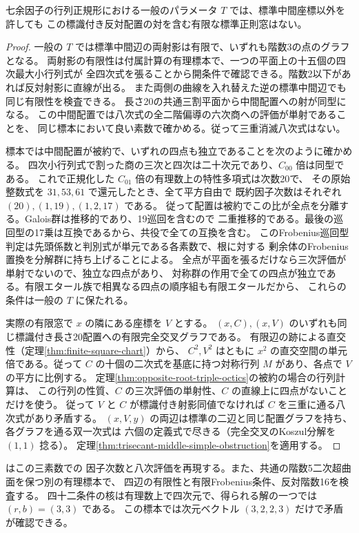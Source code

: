 \begin{corollary}\label{cor:generic-seven-cofactor-pair-excluded}
七余因子の行列正規形における一般のパラメータ $T$ では、標準中間座標以外を許しても
この標識付き反対配置の対を含む有限な標準正則窓はない。
\end{corollary}
\begin{proof}
一般の $T$ では標準中間辺の両射影は有限で、いずれも階数3の点のグラフとなる。
両射影の有限性は付属計算の有理標本で、一つの平面上の十五個の四次最大小行列式が
全四次式を張ることから開条件で確認できる。階数2以下があれば反対射影に直線が出る。
また両側の曲線を入れ替えた逆の標準中間辺でも同じ有限性を検査できる。
長さ20の共通三割平面から中間配置への射が同型になる。
この中間配置では八次式の全二階偏導の六次商への評価が単射であることを、
同じ標本において良い素数で確かめる。従って三重消滅八次式はない。

標本では中間配置が被約で、いずれの四点も独立であることを次のように確かめる。
四次小行列式で割った商の三次と四次は二十次元であり、$C_{00}$ 倍は同型である。
これで正規化した $C_{01}$ 倍の有理数上の特性多項式は次数20で、
その原始整数式を $31,53,61$ で還元したとき、全て平方自由で
既約因子次数はそれぞれ $(20),(1,19),(1,2,17)$ である。
従って配置は被約でこの比が全点を分離する。Galois群は推移的であり、19巡回を含むので
二重推移的である。最後の巡回型の17乗は互換であるから、共役で全ての互換を含む。
このFrobenius巡回型判定は先頭係数と判別式が単元である各素数で、根に対する
剰余体のFrobenius置換を分解群に持ち上げることによる。
全点が平面を張るだけなら三次評価が単射でないので、独立な四点があり、
対称群の作用で全ての四点が独立である。有限エタール族で相異なる四点の順序組も有限エタールだから、
これらの条件は一般の $T$ に保たれる。

実際の有限窓で $x$ の隣にある座標を $V$ とする。
$(x,C),(x,V)$ のいずれも同じ標識付き長さ20配置への有限完全交叉グラフである。
有限辺の跡による直交性（定理\ref{thm:finite-square-chart}）から、
$C^2,V^2$ はともに $x^2$ の直交空間の単元倍である。従って
$C$ の十個の二次式を基底に持つ対称行列 $M$ があり、各点で $V$ の平方に比例する。
定理\ref{thm:opposite-root-triple-octics}の被約の場合の行列計算は、
この行列の性質、$C$ の三次評価の単射性、$C$ の直線上に四点がないことだけを使う。
従って $V$ と $C$ が標識付き射影同値でなければ $C$ を三重に通る八次式があり矛盾する。
$(x,V,y)$ の両辺は標準の二辺と同じ配置グラフを持ち、各グラフを通る双一次式は
六個の定義式で尽きる（完全交叉のKoszul分解を $(1,1)$ 捻る）。
定理\ref{thm:trisecant-middle-simple-obstruction}を適用する。
\end{proof}

 はこの三素数での
因子次数と八次評価を再現する。また、共通の階数5二次超曲面を保つ別の有理標本で、
四辺の有限性と有限Frobenius条件、反対階数16を検査する。
四十二条件の核は有理数上で四次元で、得られる解の一つでは $(r,b)=(3,3)$ である。
この標本では次元ベクトル $(3,2,2,3)$ だけで矛盾が確認できる。
